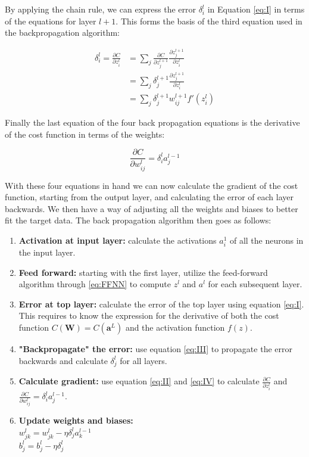 \documentclass[a4paper, UKenglish, 11pt]{uiomaster}
\begin{document}
By applying the chain rule, we can express the error $\delta_i^l$ in Equation \ref{eq:I} in terms of the equations for layer $l+1$. This forms the basis of the third equation used in the backpropagation algorithm:

\begin{align}
\delta_i^l = \frac{\partial C}{\partial z^l_{i}}
&= \sum_j \frac{\partial C}{\partial z_j^{l+1}}\frac{\partial z_j^{l+1}}{\partial z_i^l} \nonumber \\
&= \sum_j \delta_j^{l+1} \frac{\partial z_j^{l+1}}{\partial z_i^l} \nonumber \\
&= \sum_j \delta_j^{l+1}w_{ij}^{l+1}f'(z_i^l) \label{eq:III}
\end{align}

Finally the last equation of the four back propagation equations is the derivative of the cost function in terms of the weights:

\begin{equation}
    \frac{\partial C}{\partial w^l_{ij}} = \delta_i^l a_j^{l-1}
\label{eq:IV}
\end{equation}

With these four equations in hand we can now calculate the gradient of the cost function, starting from the output layer, and calculating the error of each layer backwards. We then have a way of adjusting all the weights and biases to better fit the target data. The back propagation algorithm then goes as follows:

\begin{enumerate}
  \item \textbf{Activation at input layer:} calculate the activations $a_i^1$ of all the neurons in the input layer.
  \item \textbf{Feed forward:} starting with the first layer, utilize the feed-forward algorithm through \ref{eq:FFNN} to compute $z^{l}$ and $a^{l}$ for each subsequent layer.
  \item \textbf{Error at top layer:} calculate the error of the top layer using equation \ref{eq:I}. This requires to know the expression for the derivative of both the cost function $C(\boldsymbol{W}) = C(\boldsymbol{a}^L)$ and the activation function $f(z)$.
  \item \textbf{"Backpropagate" the error:} use equation \ref{eq:III} to propagate the error backwards and calculate $\delta_j^l$ for all layers.
  \item \textbf{Calculate gradient:} use equation \ref{eq:II} and \ref{eq:IV} to calculate $\frac{\partial C}{\partial z^l_{i}}$ and $\frac{\partial C}{\partial w^l_{ij}} = \delta_i^l a_j^{l-1}$. \newline
  \item \textbf{Update weights and biases:} \\[2pt] $w^l_{jk}=w^l_{jk}-\eta\delta^l_ja^{l-1}_k$ \\[2pt] $b_j^l = b_j^l - \eta \delta_j^l$
\end{enumerate}
\end{document}
